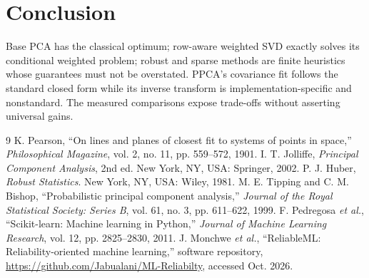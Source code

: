 \documentclass[conference]{IEEEtran}
\begin{document}
\section{Conclusion}
Base PCA has the classical optimum; row-aware weighted SVD exactly solves its conditional weighted problem; robust and sparse methods are finite heuristics whose guarantees must not be overstated. PPCA's covariance fit follows the standard closed form while its inverse transform is implementation-specific and nonstandard. The measured comparisons expose trade-offs without asserting universal gains.
\begin{thebibliography}{9}
 K. Pearson, ``On lines and planes of closest fit to systems of points in space,'' \emph{Philosophical Magazine}, vol. 2, no. 11, pp. 559--572, 1901.
 I. T. Jolliffe, \emph{Principal Component Analysis}, 2nd ed. New York, NY, USA: Springer, 2002.
 P. J. Huber, \emph{Robust Statistics}. New York, NY, USA: Wiley, 1981.
 M. E. Tipping and C. M. Bishop, ``Probabilistic principal component analysis,'' \emph{Journal of the Royal Statistical Society: Series B}, vol. 61, no. 3, pp. 611--622, 1999.
 F. Pedregosa \emph{et al.}, ``Scikit-learn: Machine learning in Python,'' \emph{Journal of Machine Learning Research}, vol. 12, pp. 2825--2830, 2011.
 J. Monchwe \emph{et al.}, ``ReliableML: Reliability-oriented machine learning,'' software repository, \url{https://github.com/Jabualani/ML-Reliabilty}, accessed Oct. 2026.
\end{thebibliography}
\end{document}
